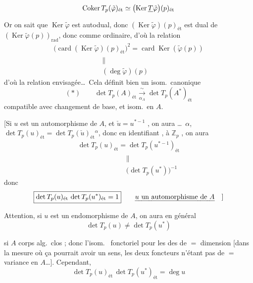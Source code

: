 \documentclass[11pt,a4paper]{article}
\begin{document}
\[
\operatorname{Coker} T_p(\tilde\varphi)_{\text{ét}} \simeq
\bigl(\operatorname{Ker} \struck{T}\tilde\varphi\bigr)(p)_{\text{ét}}
\]
Or on sait que $\operatorname{Ker}\tilde\varphi$ est autodual, donc
$(\operatorname{Ker}\tilde\varphi)(p)_{\text{ét}}$ est dual de
$(\operatorname{Ker}\tilde\varphi(p))_{\mathrm{rad}}$, donc comme \ill{}
ordinaire, d'où la relation
\[
\begin{array}{c}
\bigl(\operatorname{card} (\operatorname{Ker}\tilde\varphi)(p)_{\text{ét}}\bigr)^2
= \operatorname{card} \operatorname{Ker}(\tilde\varphi(p)) \\
\hspace{7em}\| \\
\hspace{7em}(\deg\tilde\varphi)(p)
\end{array}
\]
d'où la relation envisagée\ldots\ Cela définit bien un isom.\ canonique
\[
(*) \qquad \boxed{\det T_p(A)_{\text{ét}} \xrightarrow[\alpha_A]{\ \sim\ }
\det T_p(A^*)_{\text{ét}}}
\]
compatible avec changement de base, et isom.\ en $A$.

[Si $u$ est un automorphisme de $A$, et $\check u = u^{*-1}$ 
, on aura \ldots\ $\alpha$, $\det T_p(u)_{\text{ét}} = \det T_p(\check
u)_{\text{ét}}{}^{\alpha}$, donc en identifiant , \ill{} \ill{} à
$\mathbb{Z}_p$ \struck{\ill{}}, on aura
\[
\begin{array}{c}
\det T_p(u)_{\text{ét}} = \det T_p(u^{*-1})_{\text{ét}} \\
\hspace{7em}\| \\
\hspace{7em}\bigl(\det T_p(u^*)\bigr)^{-1}
\end{array}
\]
donc
\[
\boxed{\det T_p(u)_{\text{ét}}\,\det T_p(u^*)_{\text{ét}} = 1}
\qquad \text{\emph{$u$ un automorphisme de $A$}} \quad ]
\]

Attention, si $u$ est un endomorphisme de $A$, on aura en général
\[
\det T_p(u) \neq \det T_p(u^*)
\]


 si $A$ \ill{} \ill{}  corps alg.\ clos ; donc l'isom.\ 
\emph{} fonctoriel pour les  des  de $=$ dimension [dans la mesure où ça
pourrait avoir un sens, les deux foncteurs n'étant pas de $=$ variance en
$A$\ldots]. Cependant, \struck{\ill{}}
\[
\boxed{\det T_p(u)_{\text{ét}}\, \det T_p(u^*)_{\text{ét}} = \deg u}
\]
\end{document}
